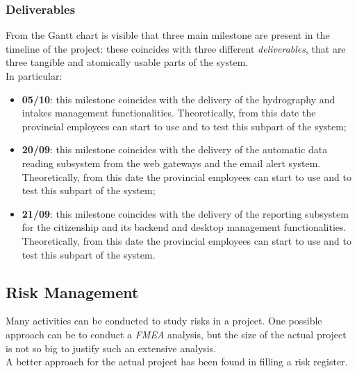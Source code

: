 \subsubsection{Deliverables}
From the Gantt chart is visible that three main milestone are present in the timeline of the project: these coincides with three different \textit{deliverables}, that are three tangible and atomically usable parts of the system.\\
In particular:
\begin{itemize}
    \item \textbf{05/10}: this milestone coincides with the delivery of the hydrography and intakes management functionalities. Theoretically, from this date the provincial employees can start to use and to test this subpart of the system;
    \item \textbf{20/09}: this milestone coincides with the delivery of the automatic data reading subsystem from the web gateways and the email alert system. Theoretically, from this date the provincial employees can start to use and to test this subpart of the system;
    \item \textbf{21/09}: this milestone coincides with the delivery of the reporting subsystem for the citizenship and its backend and desktop management functionalities. Theoretically, from this date the provincial employees can start to use and to test this subpart of the system.
\end{itemize}

\pagebreak
\subsection{Risk Management}
Many activities can be conducted to study risks in a project. One possible approach can be to conduct a \textit{FMEA} analysis, but the size of the actual project is not so big to justify such an extensive analysis. \\
A better approach for the actual project has been found in filling a risk register.

